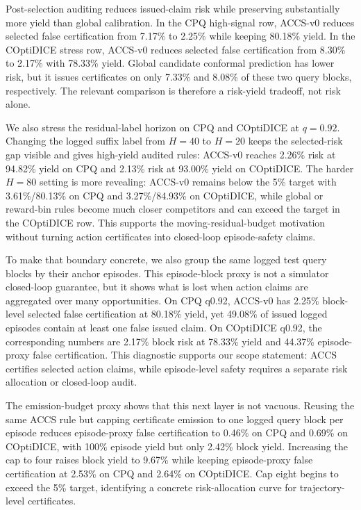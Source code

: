 \documentclass[letterpaper]{article}
\begin{document}
Post-selection auditing reduces issued-claim risk while preserving substantially
more yield than global calibration. In the CPQ high-signal row, ACCS-v0 reduces
selected false certification from 7.17\% to 2.25\% while keeping 80.18\% yield.
In the COptiDICE stress row, ACCS-v0 reduces selected false certification from
8.30\% to 2.17\% with 78.33\% yield. Global candidate conformal prediction has
lower risk, but it issues certificates on only 7.33\% and 8.08\% of these two
query blocks, respectively. The relevant comparison is therefore a risk-yield
tradeoff, not risk alone.

We also stress the residual-label horizon on CPQ and COptiDICE at $q=0.92$.
Changing the logged suffix label from $H=40$ to $H=20$ keeps the selected-risk
gap visible and gives high-yield audited rules: ACCS-v0 reaches 2.26\% risk at
94.82\% yield on CPQ and 2.13\% risk at 93.00\% yield on COptiDICE. The harder
$H=80$ setting is more revealing: ACCS-v0 remains below the 5\% target with
3.61\%/80.13\% on CPQ and 3.27\%/84.93\% on COptiDICE, while global or
reward-bin rules become much closer competitors and can exceed the target in
the COptiDICE row. This supports the moving-residual-budget motivation without
turning action certificates into closed-loop episode-safety claims.

To make that boundary concrete, we also group the same logged test query blocks
by their anchor episodes. This episode-block proxy is not a simulator closed-loop
guarantee, but it shows what is lost when action claims are aggregated over many
opportunities. On CPQ q0.92, ACCS-v0 has 2.25\% block-level selected false
certification at 80.18\% yield, yet 49.08\% of issued logged episodes contain at
least one false issued claim. On COptiDICE q0.92, the corresponding numbers are
2.17\% block risk at 78.33\% yield and 44.37\% episode-proxy false
certification. This diagnostic supports our scope statement: ACCS certifies
selected action claims, while episode-level safety requires a separate risk
allocation or closed-loop audit.

The emission-budget proxy shows that this
next layer is not vacuous. Reusing the same ACCS rule but capping certificate
emission to one logged query block per episode reduces episode-proxy false
certification to 0.46\% on CPQ and 0.69\% on COptiDICE, with 100\% episode
yield but only 2.42\% block yield. Increasing the cap to four raises block
yield to 9.67\% while keeping episode-proxy false certification at 2.53\% on
CPQ and 2.64\% on COptiDICE. Cap eight begins to exceed the 5\% target,
identifying a concrete risk-allocation curve for trajectory-level
certificates.
\end{document}
